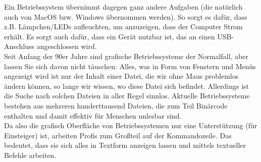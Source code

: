 Ein Betriebssystem übernimmt dagegen ganz andere Aufgaben (die natürlich auch von MacOS bzw. Windows übernommen werden). So sorgt es dafür, dass z.B. Lämpchen/LEDs aufleuchten, um anzuzeigen, dass der Computer Strom erhält. Es sorgt auch dafür, dass ein Gerät nutzbar ist, das an einen USB-Anschluss angeschlossen wird.\\

Seit Anfang der 90er Jahre sind grafische Betriebssysteme der Normalfall, aber lassen Sie sich davon nicht täuschen: Alles, was in Form von Fenstern und Menüs angezeigt wird ist nur der Inhalt einer Datei, die wir ohne Maus problemlos ändern können, so lange wir wissen, wo diese Datei sich befindet. Allerdings ist die Suche nach solchen Dateien in aller Regel sinnlos. Aktuelle Betriebssysteme bestehen aus mehreren hunderttausend Dateien, die zum Teil Binärcode enthalten und damit effektiv für Menschen unlesbar sind.\\

Da also die grafisch Oberfläche von Betriebssystemen nur eine Unterstützung (für Einsteiger) ist, arbeiten Profis zum Großteil auf der Kommandozeile. Das bedeutet, dass sie sich alles in Textform anzeigen lassen und mittels textueller Befehle arbeiten.\\

